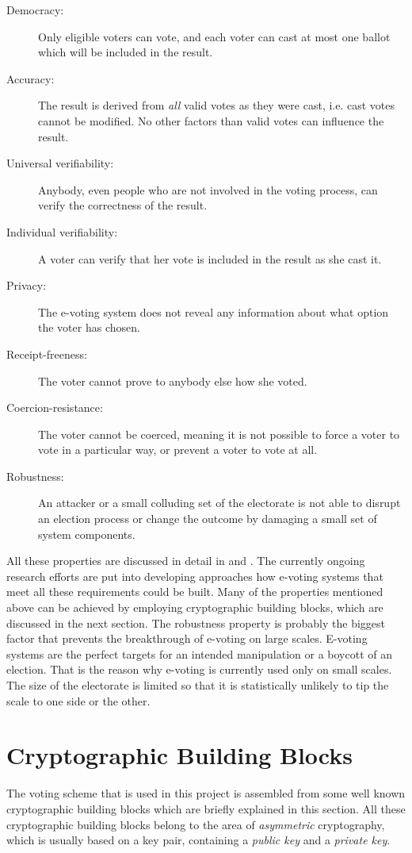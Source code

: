 \documentclass[numbers=noenddot, abstract=on, a4paper, headsepline,
footsepline, oneside, openright, draft=off, listof=leveldown]{scrreprt}
\begin{document}
\begin{description}
  \item[Democracy:] Only eligible voters can vote, and each voter can
  cast at most one ballot which will be included in the result.
  \item[Accuracy:] The result is derived from \emph{all} valid
  votes as they were cast, i.e. cast votes cannot be modified. No other factors
  than valid votes can influence the result.
  \item[Universal verifiability:] Anybody, even people who are not involved in
  the voting process, can verify the correctness of the result.
  \item[Individual verifiability:] A voter can verify that her vote
  is included in the result as she cast it.
  \item[Privacy:] The e-voting system does not reveal any information about what
  option the voter has chosen.
  \item[Receipt-freeness:] The voter cannot prove to anybody else how
  she voted.
  \item[Coercion-resistance:] The voter cannot be coerced, meaning it is not
  possible to force a voter to vote in a particular way, or prevent a voter to
  vote at all.
  \item[Robustness:] An attacker or a small colluding set of the electorate is
  not able to disrupt an election process or change the outcome by damaging a
  small set of system components.
\end{description}

All these properties are discussed in detail in \cite{HS11} and \cite{Jonker09}.
The currently ongoing research efforts are put into developing approaches how
e-voting systems that meet all these requirements could be built. Many of the
properties mentioned above can be achieved by employing cryptographic building
blocks, which are discussed in the next section. The robustness property is
probably the biggest factor that prevents the breakthrough of e-voting on large scales.
E-voting systems are the perfect targets for an intended manipulation or a
boycott of an election. That is the reason why e-voting is currently used
only on small scales. The size of the electorate is limited so that it is
statistically unlikely to tip the scale to one side or the other.

\section{Cryptographic Building Blocks}
\label{sec:buildingblocks}
The voting scheme that is used in this project is assembled from some
well known cryptographic building blocks which are briefly explained in this section.
All these cryptographic building blocks belong to the area of \emph{asymmetric}
cryptography, which is usually based on a key pair, containing a
\emph{public key} and a \emph{private key}.
\end{document}
